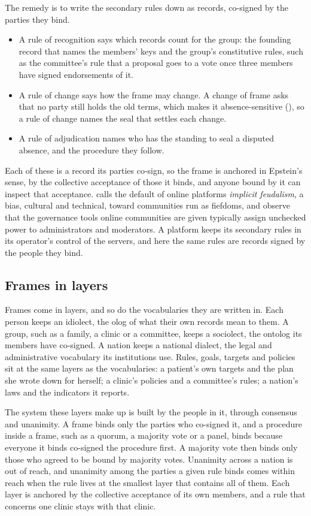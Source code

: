 The remedy is to write the secondary rules down as records, co-signed by the parties they bind.
\begin{itemize}[leftmargin=1.5em,itemsep=2pt]
  \item A rule of recognition says which records count for the group: the founding record that
    names the members' keys and the group's constitutive rules, such as the committee's rule that a
    proposal goes to a vote once three members have signed endorsements of it.
  \item A rule of change says how the frame may change. A change of frame asks that no party still
    holds the old terms, which makes it absence-sensitive (), so a rule of
    change names the seal that settles each change.
  \item A rule of adjudication names who has the standing to seal a disputed absence, and the
    procedure they follow.
\end{itemize}
Each of these is a record its parties co-sign, so the frame is anchored in Epstein's sense, by the
collective acceptance of those it binds, and anyone bound by it can inspect that acceptance.
\citet{schneider2024} calls the default of online platforms \emph{implicit feudalism}, a bias,
cultural and technical, toward communities run as fiefdoms, and \citet{schneider2021} observe that
the governance tools online communities are given typically assign unchecked power to administrators
and moderators. A platform keeps its secondary rules in its operator's control of the servers, and
here the same rules are records signed by the people they bind.

\subsection{Frames in layers}\label{sec:layers}

Frames come in layers, and so do the vocabularies they are written in. Each person keeps an
idiolect, the olog of what their own records mean to them. A group, such as a family, a clinic or a
committee, keeps a sociolect, the ontolog its members have co-signed. A nation keeps a national
dialect, the legal and administrative vocabulary its institutions use. Rules, goals, targets and
policies sit at the same layers as the vocabularies: a patient's own targets and the plan she wrote
down for herself; a clinic's policies and a committee's rules; a nation's laws and the indicators it
reports.

The system these layers make up is built by the people in it, through consensus and unanimity. A
frame binds only the parties who co-signed it, and a procedure inside a frame, such as a quorum, a
majority vote or a panel, binds because everyone it binds co-signed the procedure first. A majority
vote then binds only those who agreed to be bound by majority votes. Unanimity across a nation is
out of reach, and unanimity among the parties a given rule binds comes within reach when the rule
lives at the smallest layer that contains all of them. Each layer is anchored by the collective
acceptance of its own members, and a rule that concerns one clinic stays with that clinic.

